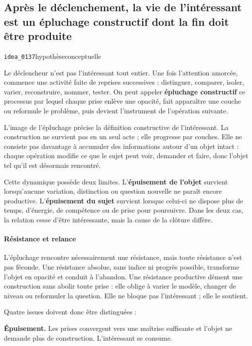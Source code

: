 \documentclass[10pt,a4paper]{article}
\begin{document}
\subsection{Après le déclenchement, la vie de l'intéressant est un épluchage constructif dont la fin doit être produite}
{\small\color{metadata} \texttt{idea\_0137}\quad\textbullet\quad hypothèse\quad\textbullet\quad conceptuelle\par}

Le déclencheur n'est pas l'intéressant tout entier. Une fois l'attention amorcée, commence une activité faite de reprises successives : distinguer, comparer, isoler, varier, reconstruire, nommer, tester. On peut appeler \textbf{épluchage constructif} ce processus par lequel chaque prise enlève une opacité, fait apparaître une couche ou reformule le problème, puis devient l'instrument de l'opération suivante.

L'image de l'épluchage précise la définition constructive de l'intéressant. La construction ne survient pas en un seul acte ; elle progresse par couches. Elle ne consiste pas davantage à accumuler des informations autour d'un objet intact : chaque opération modifie ce que le sujet peut voir, demander et faire, donc l'objet tel qu'il est désormais rencontré.

Cette dynamique possède deux limites. L'\textbf{épuisement de l'objet} survient lorsqu'aucune variation, distinction ou question nouvelle ne paraît encore productive. L'\textbf{épuisement du sujet} survient lorsque celui-ci ne dispose plus de temps, d'énergie, de compétence ou de prise pour poursuivre. Dans les deux cas, la relation cesse d'être intéressante, mais la cause de la clôture diffère.

\paragraph{Résistance et relance}
L'épluchage rencontre nécessairement une résistance, mais toute résistance n'est pas féconde. Une résistance absolue, sans indice ni progrès possible, transforme l'objet en opacité et conduit à l'abandon. Une résistance productive dément une construction sans abolir toute prise : elle oblige à varier le modèle, changer de niveau ou reformuler la question. Elle ne bloque pas l'intéressant ; elle le soutient.

Quatre issues doivent donc être distinguées :

\textbf{Épuisement.} Les prises convergent vers une maîtrise suffisante et l'objet ne demande plus de construction. L'intéressant se consume.
\end{document}

